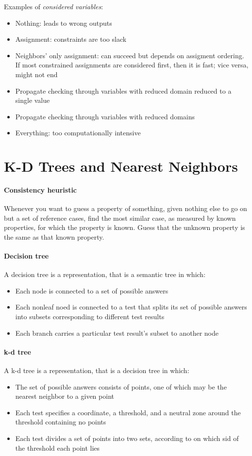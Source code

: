 \documentclass{article}
\begin{document}
Examples of \textit{considered variables}:
\begin{itemize}
  \item Nothing: leads to wrong outputs
  \item Assignment: constraints are too slack
  \item Neighbors' only assignment: can succeed but depends on
    assigment ordering. If most constrained assignments are
    considered first, then it is fast; vice versa, might not end
  \item Propagate checking through variables with reduced domain
    reduced to a single value
  \item Propagate checking through variables with reduced domains 
  \item Everything: too computationally intensive
\end{itemize}

\section{K-D Trees and Nearest Neighbors}

\paragraph{Consistency heuristic} Whenever you want to guess a
property of something, given nothing else to go on but a set of
reference cases, find the most similar case, as measured by known
properties, for which the property is known. Guess that the
unknown property is the same as that known property.

\paragraph{Decision tree} A decision tree is a representation,
that is a semantic tree in which:
\begin{itemize}
  \item Each node is connected to a set of possible answers
  \item Each nonleaf noed is connected to a test that splits its
    set of possible answers into subsets corresponding to
    different test results
  \item Each branch carries a particular test result's subset to
    another node
\end{itemize}

\paragraph{k-d tree} A k-d tree is a representation,
that is a decision tree in which:
\begin{itemize}
  \item The set of possible answers consists of points, one of
    which may be the nearest neighbor to a given point
  \item Each test specifies a coordinate, a threshold, and a
    neutral zone around the threshold containing no points
  \item Each test divides a set of points into two sets, according
    to on which sid of the threshold each point lies
\end{itemize}
\end{document}
